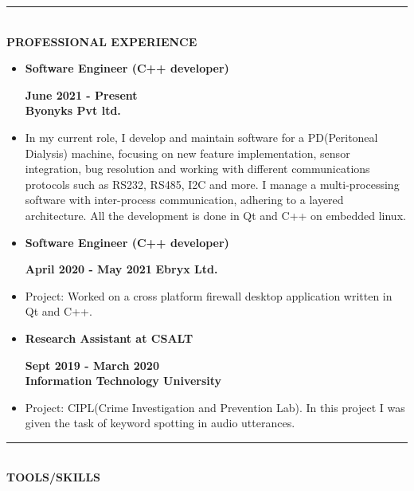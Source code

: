 \documentclass[9pt,a4paper]{article}
\newcommand{\MyHorizontalLine}{\noindent\rule{\linewidth}{1.5pt}\\}
\begin{document}
\MyHorizontalLine
	\textbf{PROFESSIONAL EXPERIENCE}
	\begin{itemize}
		\item \raggedleft\textbf{Software Engineer (C++ developer)}
		\hfill
		\raggedright\textbf{June 2021 - Present}\\
		\textbf{Byonyks Pvt ltd.}
		\item []	\justifying
		In my current role, I develop and maintain software for a PD(Peritoneal Dialysis) machine, focusing on new feature implementation, sensor integration, bug resolution and working with different communications protocols such as RS232, RS485, I2C and more. I manage a multi-processing software with inter-process communication, adhering to a layered architecture. All the development is done in Qt and C++ on embedded linux.
		\item \raggedleft\textbf{Software Engineer (C++ developer)}
		\hfill
		\raggedright\textbf{April 2020 - May 2021}
		\textbf{Ebryx Ltd.}\\
		\item[]\justifying
		Project: Worked on a cross platform firewall desktop application written in Qt and C++.
		\item \raggedleft\textbf{Research Assistant at CSALT}
		\hfill
		\raggedright\textbf{Sept 2019 - March 2020}\\
		\textbf{Information Technology University}
		\item[]\justifying
		Project: CIPL(Crime Investigation and Prevention Lab). In this project I was given the task of keyword spotting in audio utterances.
	\end{itemize}
\MyHorizontalLine
	\textbf{TOOLS/SKILLS}
\end{document}
